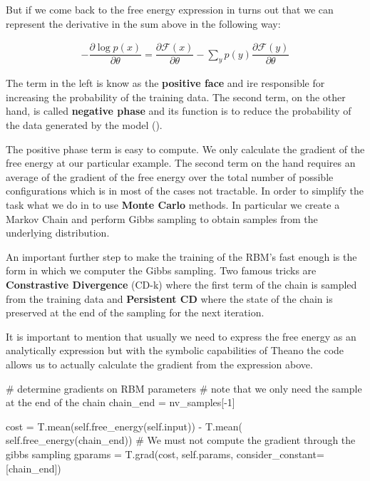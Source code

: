 \documentclass[11pt,a4paper]{article}
\begin{document}
But if we come back to the free energy expression in turns out that we can represent the derivative in the sum above in the following way:

\begin{align*}
- \dfrac{\partial{\log p(x)}}{\partial{\theta}} = \dfrac{\partial{\mathcal{F}(x)}}{\partial{\theta}} - \sum_{y} p(y) \dfrac{\partial{\mathcal{F}(y)}}{\partial{\theta}}
\end{align*}

The term in the left is know as the \textbf{positive face} and ire responsible for increasing the probability of the training data. The second term, on the other hand, is called \textbf{negative phase} and its function is to reduce the probability of the data generated by the model (\cite{yoshua2009learning}).

The positive phase term is easy to compute. We only calculate the gradient of the free energy at our particular example. The second term on the hand requires an average of the gradient of the free energy over the total number of possible configurations which is in most of the cases not tractable. In order to simplify the task what we do in to use \textbf{Monte Carlo} methods. In particular we create a Markov Chain and perform Gibbs sampling to obtain samples from the underlying distribution. 

An important further step to make the training of the RBM's fast enough is the form in which we computer the Gibbs sampling. Two famous tricks are \textbf{Constrastive Divergence} (CD-k) where the first term of the chain is sampled from the training data and \textbf{Persistent CD} where the state of the chain is preserved at the end of the sampling for the next iteration. 

It is important to mention that usually we need to express the free energy as an analytically expression but with the symbolic capabilities of Theano the code allows us to actually calculate the gradient from the expression above. 

\begin{python}
   # determine gradients on RBM parameters
        # note that we only need the sample at the end of the chain
        chain_end = nv_samples[-1]

        cost = T.mean(self.free_energy(self.input)) - T.mean(
            self.free_energy(chain_end))
        # We must not compute the gradient through the gibbs sampling
        gparams = T.grad(cost, self.params, consider_constant=[chain_end])
\end{python}
\end{document}
